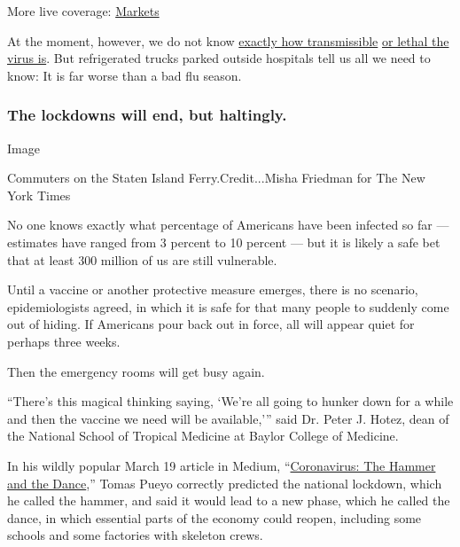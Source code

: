 More live coverage:
\href{https://www.nytimes3xbfgragh.onion/live/2020/08/04/business/stock-market-today-coronavirus?action=click\&pgtype=Article\&state=default\&region=MAIN_CONTENT_1\&context=storylines_live_updates}{Markets}

At the moment, however, we do not know
\href{https://www.scmp.com/news/china/science/article/3079879/chinas-initial-coronavirus-outbreak-wuhan-spread-twice-fast-we}{exactly
how transmissible}
\href{https://www.nytimes3xbfgragh.onion/2020/04/17/us/coronavirus-death-rate.html}{or
lethal the virus is}. But refrigerated trucks parked outside hospitals
tell us all we need to know: It is far worse than a bad flu season.

\hypertarget{the-lockdowns-will-end-but-haltingly}{%
\subsubsection{The lockdowns will end, but
haltingly.}\label{the-lockdowns-will-end-but-haltingly}}

Image

Commuters on the Staten Island Ferry.Credit...Misha Friedman for The New
York Times

No one knows exactly what percentage of Americans have been infected so
far --- estimates have ranged from 3 percent to 10 percent --- but it is
likely a safe bet that at least 300 million of us are still vulnerable.

Until a vaccine or another protective measure emerges, there is no
scenario, epidemiologists agreed, in which it is safe for that many
people to suddenly come out of hiding. If Americans pour back out in
force, all will appear quiet for perhaps three weeks.

Then the emergency rooms will get busy again.

``There's this magical thinking saying, `We're all going to hunker down
for a while and then the vaccine we need will be available,''' said Dr.
Peter J. Hotez, dean of the National School of Tropical Medicine at
Baylor College of Medicine.

In his wildly popular March 19 article in Medium,
``\href{https://medium.com/@tomaspueyo/coronavirus-the-hammer-and-the-dance-be9337092b56}{Coronavirus:
The Hammer and the Dance},'' Tomas Pueyo correctly predicted the
national lockdown, which he called the hammer, and said it would lead to
a new phase, which he called the dance, in which essential parts of the
economy could reopen, including some schools and some factories with
skeleton crews.

